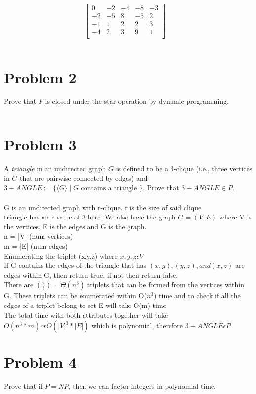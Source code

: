 \documentclass[12pt]{article}
\begin{document}
$$
\begin{bmatrix} 
0  & -2 & -4 & -8 & -3 \\
-2 & -5 & 8  & -5 & 2  \\
-1 & 1  & 2  &  2 & 3  \\
-4 & 2  & 3  &  9 & 1  \\
\end{bmatrix}
\quad
$$
\\

\newpage
\section*{Problem 2}
Prove that $P$ is closed under the star operation by dynamic programming.
\\\\

\newpage
\section*{Problem 3}
A \emph{triangle} in an undirected graph $G $ is defined to be a 3-clique (i.e., three vertices in $G$ that are pairwise connected by edges)
and $3-ANGLE := \{ \langle G \rangle \mid G \mbox{ contains a triangle }\}$. Prove that $3-ANGLE \in P$. 
\\\\
G is an undirected graph with r-clique. r is the size of said clique\\ triangle has an r value of 3 here. We also have the graph $G=(V,E)$ where V is the vertices, E is the edges and G is the graph. \\n = |V| (num vertices)\\m = |E| (num edges)\\Enumerating the triplet (x,y,z) where $x,y,z\epsilon V$ \\If G contains the edges of the triangle that has $(x,y), (y,z), and (x,z)$ are edges within G, then return true, if not then return false.\\There are $\binom{n}{3} = \Theta (n^3)$ triplets that can be formed from the vertices within G. These triplets can be enumerated within O($n^3$) time and to check if all the edges of a triplet belong to set E will take O(m) time\\The total time with both attributes together will take $O(n^3*m) or O(|V|^3*|E|)$ which is polynomial, therefore $3-ANGLE \epsilon P$
\newpage
\section*{Problem 4}
Prove that if $P = NP$, then we can factor integers in polynomial time.
\end{document}
